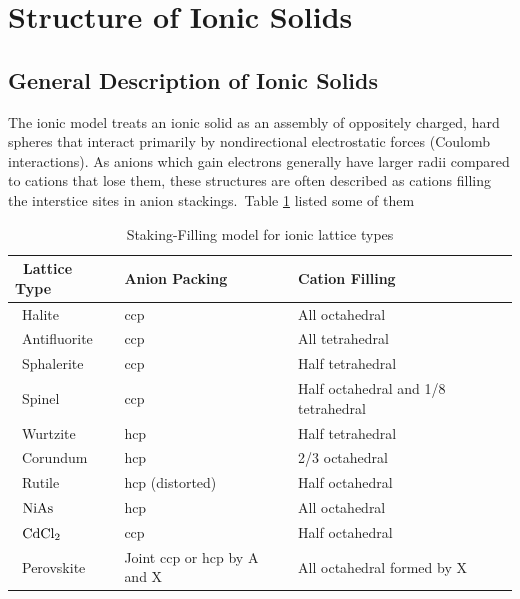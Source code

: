 \section{Structure of Ionic Solids}
%
\subsection{General Description of Ionic Solids}
%
The ionic model treats an ionic solid as an assembly of oppositely charged, hard spheres 
that interact primarily by nondirectional electrostatic forces (Coulomb interactions). 
As anions which gain electrons generally have larger radii compared to cations that lose them, 
these structures are often described as cations filling the interstice sites in anion stackings.\
Table \ref{ionicstructure} listed some of them
%
\begin{table}
	\centering
	\begin{tabular}{@{}lll@{}}
		\toprule
		\ \textbf{Lattice Type}	& 	\textbf{Anion Packing} 			&	\textbf{Cation Filling}							\ \\
		\midrule
		\ Halite				&	ccp								&	All octahedral									\ \\
		\ Antifluorite			&	ccp								&	All tetrahedral									\ \\
		\ Sphalerite			&	ccp								&	Half tetrahedral								\ \\
		\ Spinel				&	ccp								&	Half octahedral and 1/8 tetrahedral 			\ \\
		\ Wurtzite				&	hcp								&	Half tetrahedral								\ \\
		\ Corundum				&	hcp								&	2/3 octahedral									\ \\
		\ Rutile				& 	hcp (distorted)					&	Half octahedral									\ \\
		\ $\rm NiAs$			&	hcp								&	All octahedral									\ \\
		\ $\rm CdCl_2$			&	ccp								&	Half octahedral									\ \\
		\ Perovskite			&	Joint ccp or hcp by A and X 	&	All octahedral formed by X 						\ \\
		\bottomrule
	\end{tabular}
	\caption{Staking-Filling model for ionic lattice types}
	\label{ionicstructure}
\end{table}
%
